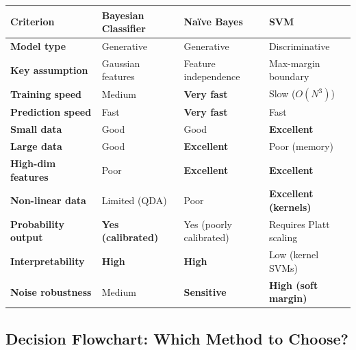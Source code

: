 \documentclass[12pt,a4paper]{article}
\begin{document}
\begin{center}
\renewcommand{\arraystretch}{1.4}
\begin{tabular}{>{\bfseries}p{2.8cm} p{3.5cm} p{3.5cm} p{3.5cm}}
\toprule
\textbf{Criterion} & \textbf{Bayesian Classifier} & \textbf{Na\"{i}ve Bayes} & \textbf{SVM} \\
\midrule
Model type & Generative & Generative & Discriminative \\
Key assumption & Gaussian features & Feature independence & Max-margin boundary \\
Training speed & Medium & \textcolor{AccentGreen}{\textbf{Very fast}} & Slow ($O(N^3)$) \\
Prediction speed & Fast & \textcolor{AccentGreen}{\textbf{Very fast}} & Fast \\
Small data & Good & Good & \textcolor{AccentGreen}{\textbf{Excellent}} \\
Large data & Good & \textcolor{AccentGreen}{\textbf{Excellent}} & Poor (memory) \\
High-dim features & Poor & \textcolor{AccentGreen}{\textbf{Excellent}} & \textcolor{AccentGreen}{\textbf{Excellent}} \\
Non-linear data & Limited (QDA) & Poor & \textcolor{AccentGreen}{\textbf{Excellent (kernels)}} \\
Probability output & \textcolor{AccentGreen}{\textbf{Yes (calibrated)}} & Yes (poorly calibrated) & Requires Platt scaling \\
Interpretability & \textcolor{AccentGreen}{\textbf{High}} & \textcolor{AccentGreen}{\textbf{High}} & Low (kernel SVMs) \\
Noise robustness & Medium & \textcolor{AccentOrange}{\textbf{Sensitive}} & \textcolor{AccentGreen}{\textbf{High (soft margin)}} \\
\bottomrule
\end{tabular}
\end{center}

\subsection{Decision Flowchart: Which Method to Choose?}
\end{document}
